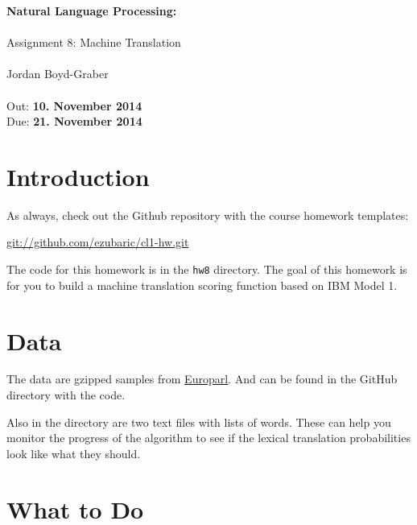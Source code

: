 \documentclass[11pt]{article}
\begin{document}
\begin{center}
{\Large{\textbf{ Natural Language Processing:  }}}\\
\mbox{}\\
{\Large{Assignment 8: Machine Translation}}\\
\mbox{}\\
{\large{Jordan Boyd-Graber}}\\
\mbox{}\\
{\large{Out: \textbf{10. November 2014}\\Due: \textbf{21. November 2014}}}\\
\end{center}


{}

\section*{Introduction} %
\label{sec:introduction}
As always, check out the Github repository with the course homework templates:

\url{git://github.com/ezubaric/cl1-hw.git}

The code for this homework is in the \texttt{hw8} directory.  The goal of this homework is for you to build a machine translation scoring function based on IBM Model 1.

\section*{Data}

The data are gzipped samples from \href{http://www.statmt.org/europarl/}{Europarl}.  And can be found in the GitHub directory with the code. 

Also in the directory are two text files with lists of words.  These can help you monitor the progress of the algorithm to see if the lexical translation probabilities look like what they should.

\section*{What to Do}
\end{document}
